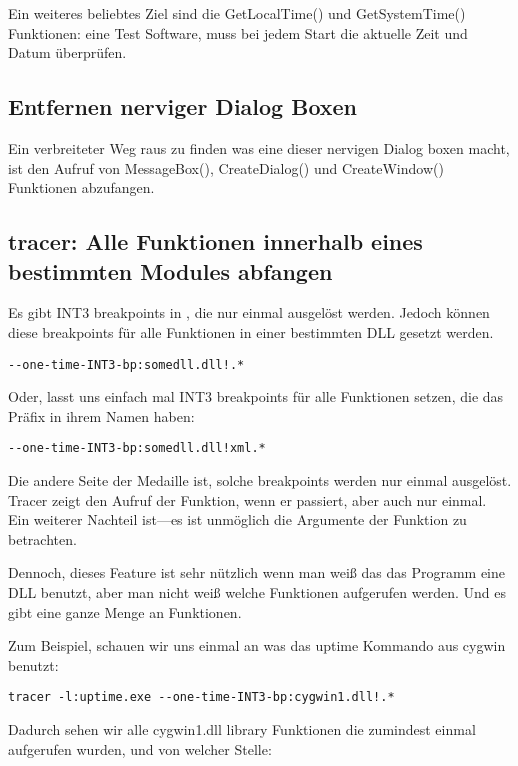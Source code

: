 Ein weiteres beliebtes Ziel sind die GetLocalTime() und GetSystemTime() Funktionen:
eine Test Software, muss bei jedem Start die aktuelle Zeit und Datum \"uberpr\"ufen.

\subsection{Entfernen nerviger Dialog Boxen}

Ein verbreiteter Weg raus zu finden was eine dieser nervigen Dialog boxen macht, ist den 
Aufruf von MessageBox(), CreateDialog() und CreateWindow() Funktionen abzufangen.


\subsection{tracer: Alle Funktionen innerhalb eines bestimmten Modules abfangen}


Es gibt INT3 breakpoints in \tracer, die nur einmal ausgel\"ost werden. Jedoch k\"onnen diese breakpoints f\"ur alle 
Funktionen in einer bestimmten DLL gesetzt werden.

\begin{lstlisting}
--one-time-INT3-bp:somedll.dll!.*
\end{lstlisting}

Oder, lasst uns einfach mal INT3 breakpoints f\"ur alle Funktionen setzen, die das  Pr\"afix in ihrem Namen haben:

\begin{lstlisting}
--one-time-INT3-bp:somedll.dll!xml.*
\end{lstlisting}

Die andere Seite der Medaille ist, solche breakpoints werden nur einmal ausgel\"ost.
Tracer zeigt den Aufruf der Funktion, wenn er passiert, aber auch nur einmal. 
Ein weiterer Nachteil ist---es ist unm\"oglich die Argumente der Funktion zu betrachten.

Dennoch, dieses Feature ist sehr n\"utzlich wenn man weiß das das Programm eine DLL benutzt,
aber man nicht weiß welche Funktionen aufgerufen werden. Und es gibt eine ganze Menge an 
Funktionen.


\par
{}
Zum Beispiel, schauen wir uns einmal an was das uptime Kommando aus cygwin benutzt:

\begin{lstlisting}
tracer -l:uptime.exe --one-time-INT3-bp:cygwin1.dll!.*
\end{lstlisting}

Dadurch sehen wir alle cygwin1.dll library Funktionen die zumindest einmal aufgerufen wurden, und von welcher
Stelle: 


